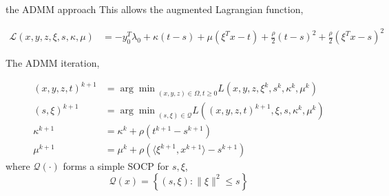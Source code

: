 \begin{frame}{the ADMM approach}
  This allows the augmented Lagrangian function,

  \begin{align*}
    \mathscr L\left(x,y,z,\xi,s,\kappa,\mu\right) & = - y_0 ^T\lambda_0 + \kappa(t-s) + \mu(\xi^Tx - t) + \frac{\rho}{2}(t-s)^2 + \frac{\rho}{2}(\xi^Tx - s)^2
  \end{align*}

  The ADMM iteration,

  \begin{align*}
    (x,y,z,t)^{k+1} & = {\arg\min}_{(x,y,z)\in\Omega, t\ge 0} L\left(x,y,z,\xi^k,s^k,\kappa^k,\mu^k\right)       \\
    (s, \xi)^{k+1}  & = {\arg\min}_{(s, \xi)\in\mathscr{Q}} L\left((x,y,z,t)^{k+1},\xi,s, \kappa^k, \mu^k\right) \\
    \kappa^{k+1}    & = \kappa^k + \rho\left(t^{k+1}-s^{k+1}\right)                                              \\
    \mu^{k+1}       & = \mu^k + \rho\left( \langle\xi^{k+1}, x^{k+1}\rangle - s^{k+1}\right)
  \end{align*}
  where \(\mathscr{Q(\cdot)}\) forms a simple SOCP for \(s, \xi\),
  \begin{equation}
    \mathscr{Q}(x) =\left\{(s,\xi): \|\xi\|^2 \le s\right\}
  \end{equation}
\end{frame}
